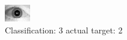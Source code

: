 \begin{figure}[h!]
\begin{center}
\includegraphics[width=0.60\columnwidth]{figures/ID1782_class_3_target_2.png}
\end{center}
\caption{ Classification: 3 actual target: 2}
\label{fig:ID1782_class_3_target_2}
\end{figure}
